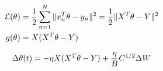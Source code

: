 \begin{align}
  \mathcal{L}(\theta) &= \frac{1}{2} \sum_{n=1}^N  \| x_n^T \theta - y_n \|^2 = \frac{1}{2} \| X^T \theta - Y \|^2 \nonumber \\
  g(\theta) &= X (X^T \theta - Y)
  \label{eq:linear_loss}
\end{align}

\begin{align}
  \Delta \theta(t) = - \eta X (X^T \theta - Y) + \frac{\eta}{B} C^{1/2} \Delta W
  \label{eq:sgd_step}
\end{align}
